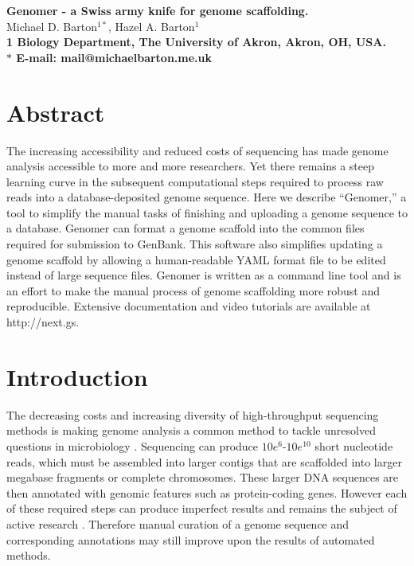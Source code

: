 \documentclass[10pt]{article}
\date{}
\begin{document}
\begin{flushleft}
{\Large
\textbf{Genomer - a Swiss army knife for genome scaffolding.}
}
\\
Michael D. Barton$^{1\ast}$, 
Hazel A. Barton$^{1}$
\\
\bf{1} Biology Department, The University of Akron, Akron, OH, USA.
\\
$\ast$ E-mail: mail@michaelbarton.me.uk
\end{flushleft}

\section*{Abstract}

The increasing accessibility and reduced costs of sequencing has made genome
analysis accessible to more and more researchers. Yet there remains a steep
learning curve in the subsequent computational steps required to process raw
reads into a database-deposited genome sequence. Here we describe ``Genomer,''
a tool to simplify the manual tasks of finishing and uploading a genome
sequence to a database. Genomer can format a genome scaffold into the common
files required for submission to GenBank. This software also simplifies
updating a genome scaffold by allowing a human-readable YAML format file to be
edited instead of large sequence files. Genomer is written as a command line
tool and is an effort to make the manual process of genome scaffolding more
robust and reproducible. Extensive documentation and video tutorials are
available at http://next.gs.

\section*{Introduction}

The decreasing costs and increasing diversity of high-throughput sequencing
methods is making genome analysis a common method to tackle unresolved
questions in microbiology \cite{loman2012b}. Sequencing can produce
$10e^{6}$-$10e^{10}$ short nucleotide reads, which must be assembled into
larger contigs that are scaffolded into larger megabase fragments or complete
chromosomes. These larger DNA sequences are then annotated with genomic
features such as protein-coding genes. However each of these required steps can
produce imperfect results and remains the subject of active research
\cite{earl2011,quail2012,beckloff2012}. Therefore manual curation of a genome
sequence and corresponding annotations may still improve upon the results of
automated methods.
\end{document}

